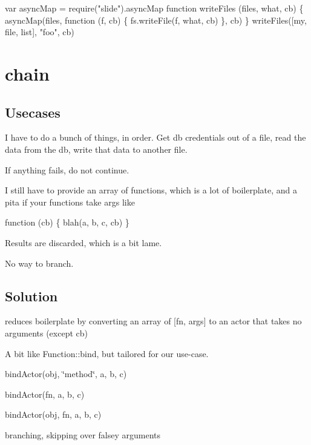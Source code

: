 \begin{DoxyCode}
var asyncMap = require("slide").asyncMap
function writeFiles (files, what, cb) \{
  asyncMap(files, function (f, cb) \{
    fs.writeFile(f, what, cb)
  \}, cb)
\}
writeFiles([my, file, list], "foo", cb)
\end{DoxyCode}


\section*{chain}

\subsection*{Usecases}


\begin{DoxyItemize}
\item I have to do a bunch of things, in order. Get db credentials out of a file, read the data from the db, write that data to another file.
\item If anything fails, do not continue.
\item I still have to provide an array of functions, which is a lot of boilerplate, and a pita if your functions take args like
\end{DoxyItemize}


\begin{DoxyCode}
function (cb) \{
  blah(a, b, c, cb)
\}
\end{DoxyCode}



\begin{DoxyItemize}
\item Results are discarded, which is a bit lame.
\item No way to branch.
\end{DoxyItemize}

\subsection*{Solution}


\begin{DoxyItemize}
\item reduces boilerplate by converting an array of \mbox{[}fn, args\mbox{]} to an actor that takes no arguments (except cb)
\item A bit like Function\+::bind, but tailored for our use-\/case.
\item bind\+Actor(obj, \char`\"{}method\char`\"{}, a, b, c)
\item bind\+Actor(fn, a, b, c)
\item bind\+Actor(obj, fn, a, b, c)
\item branching, skipping over falsey arguments
\end{DoxyItemize}


